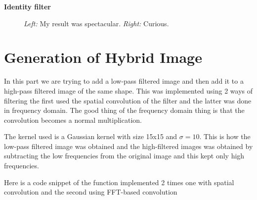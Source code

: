 \documentclass[11pt]{article}
\begin{document}
	{\Large \textbf{Identity filter}}
	
	\begin{figure}[h]
		\centering
		\caption{\emph{Left:} My result was spectacular. \emph{Right:} Curious.}
		\label{fig:result1}
	\end{figure}
	
	
	
	
	\newpage
	\section*{Generation of Hybrid Image}
	In this part we are trying to add a low-pass filtered image and then add it to a high-pass filtered image of the same shape. This was implemented using 2 ways of filtering the first used the spatial convolution of the filter and the latter was done in frequency domain. The good thing of the frequency domain thing is that the convolution becomes a normal multiplication. 
	
	The kernel used is a Gaussian kernel with size 15x15 and $\sigma = 10$.
	This is how the low-pass filtered image was obtained and the high-filtered images was obtained by subtracting the low frequencies from the original image and this kept only high frequencies. 
	
	
	
	Here is a code snippet of the function implemented 2 times one with spatial convolution and the second using FFT-based convolution
	
\end{document}
